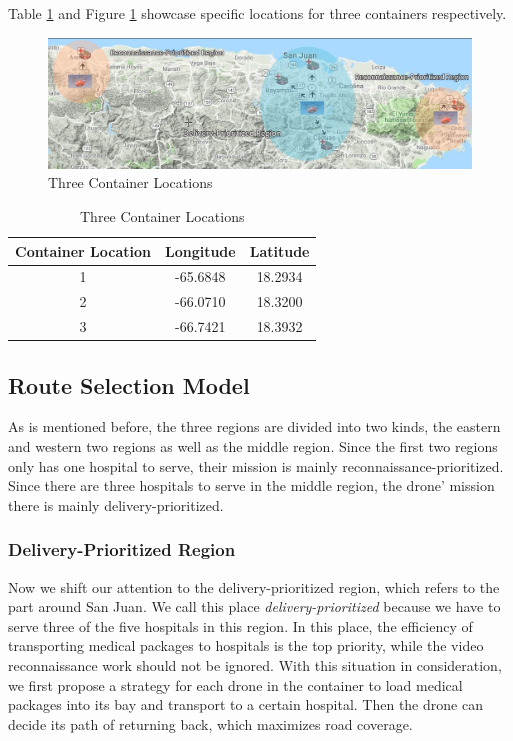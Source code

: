 \documentclass{mcmthesis}
\begin{document}
Table \ref{Tab:thre} and Figure \ref{Fig:loca} showcase specific locations for three containers respectively.

\begin{figure}[htbp]
    \centering
    \includegraphics[width=13cm]{figures/location.jpg}
    \caption{Three Container Locations}
    \label{Fig:loca}
\end{figure}

\begin{table}[htbp]
    \centering
    \begin{tabular}{c|c c}
    \hline
    Container Location & Longitude & Latitude\\
    \hline
         1 & -65.6848 & 18.2934\\
         2 & -66.0710 & 18.3200\\
         3 & -66.7421 & 18.3932\\
    \hline
    \end{tabular}
    \caption{Three Container Locations}
    \label{Tab:thre}
\end{table}


\subsection{Route Selection Model}
As is mentioned before, the three regions are divided into two kinds, the eastern and western two regions as well as the middle region. Since the first two regions only has one hospital to serve, their mission is mainly reconnaissance-prioritized. Since there are three hospitals to serve in the middle region, the drone' mission there is mainly delivery-prioritized.

\subsubsection{Delivery-Prioritized Region}\label{Subsub:deli}
Now we shift our attention to the delivery-prioritized region, which refers to the part around San Juan. We call this place \emph{delivery-prioritized} because we have to serve three of the five hospitals in this region. In this place, the efficiency of transporting medical packages to hospitals is the top priority, while the video reconnaissance work should not be ignored. With this situation in consideration, we first propose a strategy for each drone in the container to load medical packages into its bay and transport to a certain hospital. Then the drone can decide its path of returning back, which maximizes road coverage.
\end{document}
